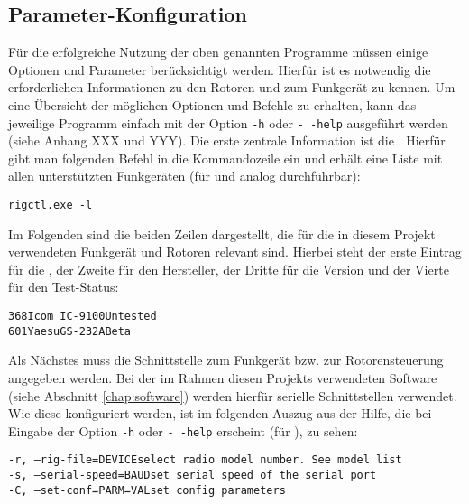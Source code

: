 \subsection{Parameter-Konfiguration}
\label{chap:hamlibconfig}

Für die erfolgreiche Nutzung der oben genannten Programme müssen einige Optionen und Parameter berücksichtigt werden. Hierfür ist es notwendig die erforderlichen Informationen zu den Rotoren und zum Funkgerät zu kennen. Um eine Übersicht der möglichen Optionen und Befehle zu erhalten, kann das jeweilige Programm einfach mit der Option \texttt{-h} oder \texttt{-\,-help} ausgeführt werden (siehe Anhang XXX und YYY).\newpar
Die erste zentrale Information ist die . Hierfür gibt man folgenden Befehl in die Kommandozeile ein und erhält eine Liste mit allen unterstützten Funkgeräten (für  und  analog durchführbar):

\vspace{-1em}
\begin{shaded}
	\texttt{rigctl.exe -l}
\end{shaded}
\vspace{-1em}

Im Folgenden sind die beiden Zeilen dargestellt, die für die in diesem Projekt verwendeten Funkgerät und Rotoren relevant sind. Hierbei steht der erste Eintrag für die , der Zweite für den Hersteller, der Dritte für die Version und der Vierte für den Test-Status:

\vspace{-1em}
\begin{shaded}
	\texttt{368\qquad Icom\qquad\ IC-9100\qquad Untested}\\%
	\texttt{601\qquad Yaesu\qquad GS-232A\qquad Beta}
\end{shaded}
\vspace{-1em}
\label{hamlibbackend}

Als Nächstes muss die Schnittstelle zum Funkgerät bzw. zur Rotorensteuerung angegeben werden. Bei der im Rahmen diesen Projekts verwendeten Software (siehe Abschnitt \ref{chap:software}) werden hierfür serielle Schnittstellen verwendet. Wie diese konfiguriert werden, ist im folgenden Auszug aus der Hilfe, die bei Eingabe der Option \texttt{-h} oder \texttt{-\,-help} erscheint (für ), zu sehen:

\vspace{-1em}
\begin{shaded}
	 \texttt{-r, --rig-file=DEVICE\qquad \qquad select radio model number. See model list} \\%
	 \texttt{-s, --serial-speed=BAUD\qquad\quad set serial speed of the serial port} \\%
	 \texttt{-C, --set-conf=PARM=VAL\qquad \quad set config parameters}
\end{shaded}
\vspace{-1em}

